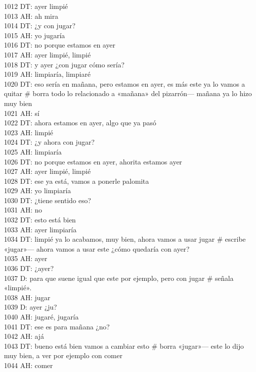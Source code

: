 1012 DT: ayer limpié\\
1013 AH: ah mira\\
1014 DT: ¿y con jugar?\\
1015 AH: yo jugaría\\
1016 DT: no porque estamos en ayer\\
1017 AH: ayer limpié, limpié\\
1018 DT: y ayer ¿con jugar cómo sería?\\
1019 AH: limpiaría, limpiaré\\
1020 DT: eso sería en mañana, pero estamos en ayer, es más este ya lo vamos a quitar \# borra todo lo relacionado a «mañana» del pizarrón--- mañana ya lo hizo muy bien\\
1021 AH: sí\\
1022 DT: ahora estamos en ayer, algo que ya pasó\\
1023 AH: limpié\\
1024 DT: ¿y ahora con jugar?\\
1025 AH: limpiaría\\
1026 DT: no porque estamos en ayer, ahorita estamos ayer\\
1027 AH: ayer limpié, limpié\\
1028 DT: ese ya está, vamos a ponerle palomita\\
1029 AH: yo limpiaría\\
1030 DT: ¿tiene sentido eso?\\
1031 AH: no\\
1032 DT: esto está bien\\
1033 AH: ayer limpiaría\\
1034 DT: limpié ya lo acabamos, muy bien, ahora vamos a usar jugar \# escribe «jugar»--- ahora vamos a usar este ¿cómo quedaría con ayer?\\
1035 AH: ayer\\
1036 DT: ¿ayer?\\
1037 D: para que suene igual que este por ejemplo, pero con jugar \# señala «limpié».\\
1038 AH: jugar\\
1039 D: ayer ¿ju?\\
1040 AH: jugaré, jugaría\\
1041 DT: ese es para mañana ¿no?\\
1042 AH: ajá\\
1043 DT: bueno está bien vamos a cambiar esto \# borra «jugar»--- este lo dijo muy bien, a ver por ejemplo con comer\\
1044 AH: comer\\
